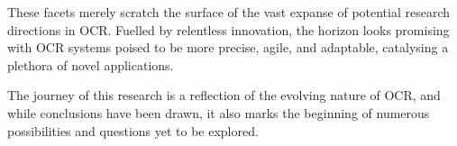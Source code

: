 These facets merely scratch the surface of the vast expanse of potential research directions in OCR. Fuelled by relentless innovation, the horizon looks promising with OCR systems poised to be more precise, agile, and adaptable, catalysing a plethora of novel applications.

The journey of this research is a reflection of the evolving nature of OCR, and while conclusions have been drawn, it also marks the beginning of numerous possibilities and questions yet to be explored.


